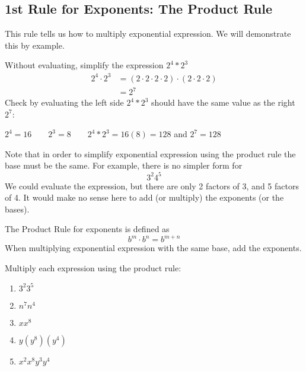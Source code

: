 \subsection{1st Rule for Exponents: The Product Rule}
This rule tells us how to multiply exponential expression. We will demonstrate
this by {example}.

Without evaluating, \gls{simplify} the expression $2^4*2^3$
\begin{align*}
	2^4\cdot 2^3 & =	(2\cdot 2\cdot 2\cdot 2)\cdot (2\cdot 2\cdot 2) \\
	             & =	2^7                                             
\end{align*} 
Check by evaluating the left side $2^4*2^3$ should have the same value as the right $2^7$:
\begin{tightcenter}
	$2^4=16 \qquad 2^3=8\qquad 2^4*2^3=16(8)=128$ and $2^7=128$
\end{tightcenter}
Note that in order to simplify exponential expression using the product rule the base must be the
same. For {example}, there is no simpler form for
\[
	3^2 4^5
\]
We could evaluate the expression, but there are only 2 factors of 3, and 5 factors of 4. It would make
no sense here to add (or multiply) the exponents (or the bases).
\begin{myDefinition}
	The Product Rule for exponents is defined as
	\[
		b^m\cdot b^n=b^{m+n}
	\]
	When multiplying exponential expression with the same base, add the exponents.
\end{myDefinition}
\begin{myexample}
Multiply each expression using the product rule:
\begin{multicols}{5}
	\begin{enumerate}
		\item $3^2 3^5$
		\item $n^7 n^4$
		\item $x x^8$
		\item $y(y^8)(y^4)$
		\item $x^2 x^8 y^3 y^4$
	\end{enumerate} 
\end{multicols}
\end{myexample}
